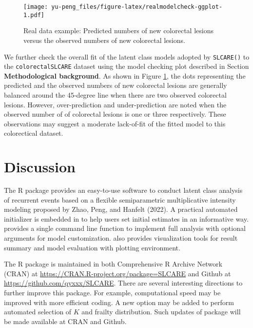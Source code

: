\begin{figure}
\centering
\texttt{[image: yu-peng\_files/figure-latex/realmodelcheck-ggplot-1.pdf]}
\caption{\label{fig:realmodelcheck-ggplot}Real data example: Predicted numbers of new colorectal lesions versus the observed numbers of new colorectal lesions.}
\end{figure}

We further check the overall fit of the latent class models adopted by \texttt{SLCARE()} to the
\texttt{colorectalSLCARE} dataset using the model checking plot described
in Section \textbf{Methodological background}.
As shown in Figure \ref{fig:realmodelcheck-ggplot}, the dots representing the predicted and the observed numbers of new colorectal lesions are generally balanced around the 45-degree line when there are two observed colorectal lesions. However, over-prediction and under-prediction are noted when the observed number of of colorectal lesions is one or three respectively. These observations may suggest a moderate lack-of-fit of the fitted model to this colorectical dataset.

\hypertarget{discussion}{%
\section{Discussion}\label{discussion}}

The R package  provides an easy-to-use software
to conduct latent class analysis of recurrent events based on a flexible
semiparametric multiplicative intensity modeling proposed by Zhao, Peng, and Hanfelt (2022). A practical automated initializer is embedded in  to help users set initial estimates in an informative way.  provides a single command line function to implement full analysis with optional arguments for model customization.  also provides visualization tools for result summary and model evaluation with  plotting environment.

The R package  is maintained in both Comprehensive R Archive Network
(CRAN) at \url{https://CRAN.R-project.org/package=SLCARE} and Github at
\url{https://github.com/qyxxx/SLCARE}. There are several interesting directions to further improve this package. For example, computational speed may be improved with more efficient coding. A new option may be added to perform automated selection of \(K\) and frailty distribution. Such updates of package  will be made available at CRAN and Github.

